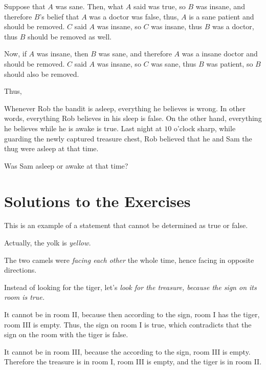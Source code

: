 \documentclass{article}
\begin{document}
\begin{soln} 
    Suppose that $A$ was sane. Then, what $A$ said was true, so $B$ was insane, and therefore $B$'s belief that $A$ was a doctor
    was false, thus, $A$ is a sane patient and should be removed.
    $C$ said $A$ was insane, so $C$ was insane, thus $B$ was a doctor, thus $B$ should be removed as well.
    
    Now, if $A$ was insane, then $B$ was sane, and therefore $A$ was a insane doctor and should be removed.
    $C$ said $A$ was insane, so $C$ was sane, thus $B$ was patient, so $B$ should also be removed.
    
    Thus, 
\end{soln}

\begin{exercise*}
    \label{exercise:pi-2022-4-p11}
    Whenever Rob the bandit is asleep, everything he believes is wrong.
    In other words, everything Rob believes in his sleep is false.
    On the other hand, everything he believes while he is awake is true.
    Last night at $10$ o'clock sharp,
    while guarding the newly captured treasure chest,
    Rob believed that he and Sam the thug were asleep at that time.
    
    Was Sam asleep or awake at that time?
\end{exercise*}

\section*{Solutions to the Exercises}

\begin{soln} 
    This is an example of a statement that cannot be determined as true or false. 
\end{soln}

\begin{soln} 
    Actually, the yolk is \textit{yellow.}
\end{soln}

\begin{soln} 
    The two camels were \textit{facing each other} the whole time, hence facing in opposite directions.
\end{soln}

\begin{soln} 
    Instead of looking for the tiger, let's \textit{look for the treasure, because the sign on its room is true.}
    
    It cannot be in room II, because then according to the sign, room I has the tiger, room III is empty.
    Thus, the sign on room I is true, which contradicts that the sign on the room with the tiger is false.
    
    It cannot be in room III, because the according to the sign, room III is empty.
    Therefore the treasure is in room I, room III is empty, and the tiger is in room II.
\end{soln}
\end{document}
